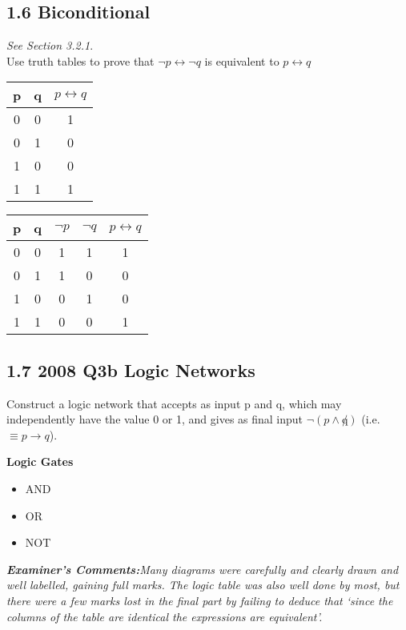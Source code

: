 \newpage
\subsection*{1.6 Biconditional}
\emph{See Section 3.2.1}.\\
Use truth tables to prove that $ \neg p \leftrightarrow \neg q $ is equivalent to  $ p \leftrightarrow q $

\begin{tabular}{|c|c|c|}
\hline  p& q & $p \leftrightarrow q$ \\ 
\hline  0& 0 &  1\\ 
\hline  0& 1 &  0\\ 
\hline  1& 0 &  0\\ 
\hline  1& 1 &  1\\ 
\hline 
\end{tabular} 


\begin{tabular}{|c|c|c|c|c|}
\hline  p& q & $\neg p$ & $\neg q$ & $p \leftrightarrow q$ \\ 
\hline  0& 0 & 1& 1 & 1\\ 
\hline  0& 1 &  1& 0& 0\\ 
\hline  1& 0 &  0& 1& 0\\ 
\hline  1& 1 &  0 & 0& 1\\ 
\hline 
\end{tabular} 
\newpage
\subsection*{1.7 2008 Q3b Logic Networks }

Construct a logic network that accepts as input p and q, which may independently have the value 0 or 1, and
gives as final input $\neg(p \wedge \not q)$ (i.e. $\equiv p \rightarrow q$).\\
\bigskip

\textbf{Logic Gates}
\begin{itemize}
\item AND
\item OR
\item NOT
\end{itemize}
\bigskip

\emph{\textbf{Examiner's Comments:}Many
diagrams were carefully and clearly drawn and well labelled, gaining full
marks. The logic table was also well done by most, but there were a few marks
lost in the final part by failing to deduce that ‘since the columns of the table are
identical the expressions are equivalent’.}

